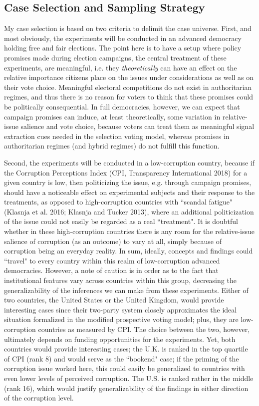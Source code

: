\documentclass[11pt]{article}
\begin{document}
\subsection{Case Selection and Sampling Strategy}
My case selection is based on two criteria to delimit the case universe. First, and most obviously, the experiments will be conducted in an advanced democracy holding free and fair elections. The point here is to have a setup where policy promises made during election campaigns, the central treatment of these experiments, are meaningful, i.e. they \textit{theoretically} can have an effect on the relative importance citizens place on the issues under considerations as well as on their vote choice. Meaningful electoral competitions do not exist in authoritarian regimes, and thus there is no reason for voters to think that these promises could be politically consequential. In full democracies, however, we can expect that campaign promises can induce, at least theoretically, some variation in relative-issue salience and vote choice, because voters can treat them as meaningful signal extraction cues needed in the selection voting model, whereas promises in authoritarian regimes (and hybrid regimes) do not fulfill this function.

Second, the experiments will be conducted in a low-corruption country, because if the Corruption Perceptions Index (CPI, Transparency International 2018) for a given country is low, then politicizing the issue, e.g. through campaign promises, should have a noticeable effect on experimental subjects and their response to the treatments, as opposed to high-corruption countries with “scandal fatigue" (Klasnja et al. 2016; Klasnja and Tucker 2013), where an additional politicization of the issue could not easily be regarded as a real “treatment". It is doubtful whether in these high-corruption countries there is any room for the relative-issue salience of corruption (as an outcome) to vary at all, simply because of corruption being an everyday reality. In sum, ideally, concepts and findings could “travel" to every country within this realm of low-corruption advanced democracies. However, a note of caution is in order as to the fact that institutional features vary across countries within this group, decreasing the generalizability of the inferences we can make from these experiments. Either of two countries, the United States or the United Kingdom, would provide interesting cases since their two-party system closely approximates the ideal situation formalized in the modified prospective voting model; plus, they are low-corruption countries as measured by CPI. The choice between the two, however, ultimately depends on funding opportunities for the experiments. Yet, both countries would provide interesting cases; the U.K. is ranked in the top quartile of CPI (rank 8) and would serve as the ``bookend" case; if the priming of the corruption issue worked here, this could easily be generalized to countries with even lower levels of perceived corruption. The U.S. is ranked rather in the middle (rank 16), which would justify generalizability of the findings in either direction of the corruption level.
\end{document}
